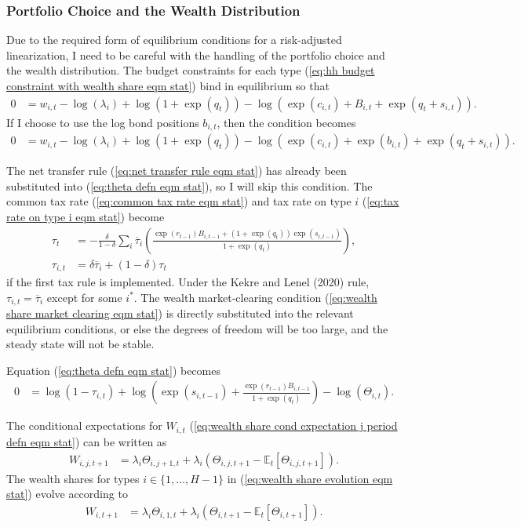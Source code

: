 \documentclass[12 pt, oneside]{article}
\theoremstyle{definition}
\theoremstyle{definition}
\theoremstyle{definition}
\newcommand{\E}{\mathbb{E}}
\begin{document}
\subsubsection{Portfolio Choice and the Wealth Distribution}
Due to the required form of equilibrium conditions for a risk-adjusted linearization, I need to be careful with the handling of the portfolio choice and the wealth distribution.
The budget constraints for each type (\ref{eq:hh budget constraint with wealth share eqm stat}) bind in equilibrium so that
\begin{align*}
  0 & = w_{i, t} - \log(\lambda_i) + \log(1 + \exp(q_t)) - \log(\exp(c_{i, t}) + B_{i, t} + \exp(q_t + s_{i, t})).
\end{align*}
If I choose to use the log bond positions $b_{i, t}$, then the condition becomes
\begin{align*}
  0 & = w_{i, t} - \log(\lambda_i) + \log(1 + \exp(q_t)) - \log(\exp(c_{i, t}) + \exp(b_{i, t}) + \exp(q_t + s_{i, t})).
\end{align*}

The net transfer rule (\ref{eq:net transfer rule eqm stat}) has already been substituted into (\ref{eq:theta defn eqm stat}),
so I will skip this condition. The common tax rate (\ref{eq:common tax rate eqm stat}) and tax rate on type $i$ (\ref{eq:tax rate on type i eqm stat}) become
\begin{align*}
  \tau_t & = -\frac{\delta}{1 - \delta}\sum_i \overline{\tau}_i\left(\frac{\exp(r_{t - 1})B_{i, t - 1} + (1 + \exp(q_t))\exp(s_{i, t - 1})}{1 + \exp(q_t)}\right),\\
  \tau_{i, t} & = \delta \overline{\tau}_i + (1 - \delta)\tau_t
\end{align*}
if the first tax rule is implemented. Under the Kekre and Lenel (2020) rule, $\tau_{i, t} = \overline{\tau}_i$ except for some $i^*$.
The wealth market-clearing condition (\ref{eq:wealth share market clearing eqm stat}) is directly substituted into the relevant equilibrium conditions, or else the degrees of freedom will be too large, and the steady state will not be stable.

Equation (\ref{eq:theta defn eqm stat}) becomes
\begin{align*}
  0 & = \log(1 - \tau_{i, t}) + \log\left(\exp(s_{i, t - 1}) + \frac{\exp(r_{t - 1}) B_{i, t - 1}}{1 + \exp(q_t)}\right) - \log(\Theta_{i, t}).
\end{align*}

The conditional expectations for $W_{i, t}$ (\ref{eq:wealth share cond expectation j period defn eqm stat}) can be written as
\begin{align*}
  W_{i, j, t + 1} & = \lambda_i\Theta_{i, j + 1, t} + \lambda_i(\Theta_{i, j, t + 1} - \E_t[\Theta_{i, j, t + 1}]).
\end{align*}
The wealth shares for types $i \in \{1,\dots, H - 1\}$ in (\ref{eq:wealth share evolution eqm stat}) evolve according to
\begin{align*}
  W_{i, t + 1} & = \lambda_i\Theta_{i, 1, t} + \lambda_i(\Theta_{i, t + 1} - \E_t[\Theta_{i, t + 1}]).
\end{align*}
\end{document}
